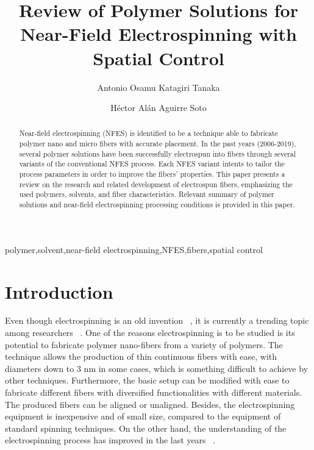 \documentclass[3p,,preprint,12pt]{elsarticle}
\begin{document}
\begin{frontmatter}
	
\title{Review of Polymer Solutions for Near-Field Electrospinning with Spatial Control
}
    
\author[]{Antonio Osamu Katagiri Tanaka}
\author[]{H{\'e}ctor Al\'{a}n Aguirre Soto}
    

\begin{abstract}
Near-field electrospinning (NFES) is identified to be a technique able to fabricate polymer nano and micro fibers with accurate placement. In the past years (2006-2019), several polymer solutions have been successfully electrospun into fibers through several variants of the conventional NFES process. Each NFES variant intents to tailor the process parameters in order to improve the fibers' properties. This paper presents a review on the research and related development of electrospun fibers, emphasizing the used polymers, solvents, and fiber characteristics. Relevant summary of polymer solutions and near-field electrospinning processing conditions is provided in this paper.
\end{abstract}
\begin{keyword} 
      polymer\sep solvent\sep near-field electrospinning\sep NFES\sep fibers\sep spatial control
\end{keyword}
      
\end{frontmatter}
\tableofcontents

    
\section{Introduction}
Even though electrospinning is an old invention \unskip~\cite{527120:12073288}, it is currently a trending topic among researchers \unskip~\cite{527120:12073453,527120:12073495,527120:12073496}. One of the reasons electrospinning is to be studied is its potential to fabricate polymer nano-fibers from a variety of polymers. The technique allows the production of thin continuous fibers with ease, with diameters down to 3 nm in some cases, which is something difficult to achieve by other techniques. Furthermore, the basic setup can be modified with ease to fabricate different fibers with diversified functionalities with different materials. The produced fibers can be aligned or unaligned. Besides, the electrospinning equipment is inexpensive and of small size, compared to the equipment of standard spinning techniques. On the other hand, the understanding of the electrospinning process has improved in the last years \unskip~\cite{527120:12073538}.
\end{document}
